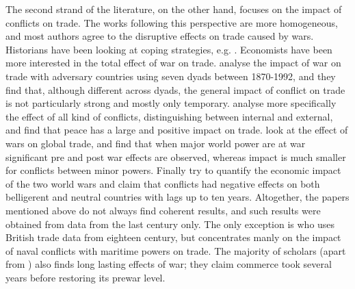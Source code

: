 \documentclass[12pt,a4paper,notitlepage,english]{article}
\begin{document}
The second strand of the literature, on the other hand, focuses on the impact of conflicts on trade.
The works following this perspective are more homogeneous, and most authors agree to the disruptive effects on trade caused by wars.
Historians have been looking at coping strategies, e.g.  \citep{Marzagalli2006}.
Economists have been more interested in the total effect of war on trade.
\cite{Levy2004} analyse the impact of war on trade with adversary countries using seven dyads between 1870-1992, and they find that, although different across dyads, the general impact of conflict on trade is not particularly strong and mostly only temporary.
\cite{Blomberg2006} analyse more specifically the effect of all kind of conflicts, distinguishing between internal and external, and find that peace has a large and positive impact on trade.
\cite{Anderton2001} look at the effect of wars on global trade, and find that when major world power are at war significant pre and post war effects are observed, whereas impact is much smaller for conflicts between minor powers.
Finally \cite{Glick2010} try to quantify the economic impact of the two world wars and claim that conflicts had negative effects on both belligerent and neutral countries with lags up to ten years.
Altogether, the papers mentioned above do not always find coherent results, and such results were obtained from data from the last century only.
The only exception is \cite{Rahman2010} who uses British trade data from eighteen century, but concentrates manly on the impact of naval conflicts with maritime powers on trade.
The majority of scholars (apart from \cite{Levy2004}) also finds long lasting effects of war; they claim commerce took several years before restoring its prewar level.\\
\end{document}
